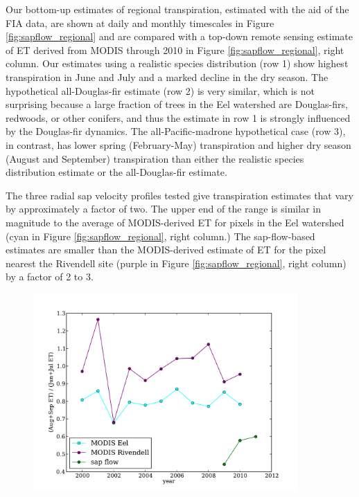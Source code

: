 Our bottom-up estimates of regional transpiration, estimated with the aid of the FIA data, are shown at daily and monthly timescales in Figure \ref{fig:sapflow_regional} and are compared with a top-down remote sensing estimate of ET derived from MODIS through 2010 in Figure \ref{fig:sapflow_regional}, right column.  Our estimates using a realistic species distribution (row 1) show highest transpiration in June and July and a marked decline in the dry season.  The hypothetical all-Douglas-fir estimate (row 2) is very similar, which is not surprising because a large fraction of trees in the Eel watershed are Douglas-firs, redwoods, or other conifers, and thus the estimate in row 1 is strongly influenced by the Douglas-fir dynamics.  The all-Pacific-madrone hypothetical case (row 3), in contrast, has lower spring (February-May) transpiration and higher dry season (August and September) transpiration than either the realistic species distribution estimate or the all-Douglas-fir estimate.

The three radial sap velocity profiles tested give transpiration estimates that vary by approximately a factor of two.  The upper end of the range is similar in magnitude to the average of MODIS-derived ET for pixels in the Eel watershed (cyan in Figure \ref{fig:sapflow_regional}, right column.)  The sap-flow-based estimates are smaller than the MODIS-derived estimate of ET for the pixel nearest the Rivendell site (purple in Figure \ref{fig:sapflow_regional}, right column) by a factor of 2 to 3.

\begin{figure}[here]
\includegraphics[width=0.9\textwidth]{ch1-sapflow/figures/Figure11.pdf}
\caption{}
\label{fig:sapflow_ratio}
\end{figure}

